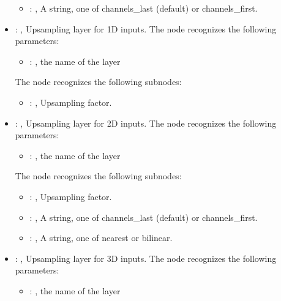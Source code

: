 \begin{itemize}
\begin{itemize}
        \item {}: , 
          A string, one of channels\_last (default) or channels\_first.
      \end{itemize}

    \item {}: , 
      Upsampling layer for 1D inputs.
      The  node recognizes the following parameters:
        \begin{itemize}
          \item {}: , 
            the name of the layer
      \end{itemize}

      The  node recognizes the following subnodes:
      \begin{itemize}
        \item {}: , 
          Upsampling factor.
      \end{itemize}

    \item {}: , 
      Upsampling layer for 2D inputs.
      The  node recognizes the following parameters:
        \begin{itemize}
          \item {}: , 
            the name of the layer
      \end{itemize}

      The  node recognizes the following subnodes:
      \begin{itemize}
        \item {}: , 
          Upsampling factor.

        \item {}: , 
          A string, one of channels\_last (default) or channels\_first.

        \item {}: , 
          A string, one of nearest or bilinear.
      \end{itemize}

    \item {}: , 
      Upsampling layer for 3D inputs.
      The  node recognizes the following parameters:
        \begin{itemize}
          \item {}: , 
            the name of the layer
      \end{itemize}


\end{itemize}
